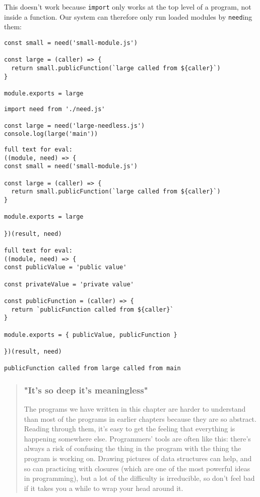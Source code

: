 \documentclass[krantzl]{krantz}
\newenvironment{callout}{\savenotes\begin{tBox}\begin{quotation}\toggletrue{inbox}\renewcommand{\thempfootnote}{\arabic{footnote}}}{\end{quotation}\vspace{\baselineskip}\end{tBox}\togglefalse{inbox}\spewnotes}
\begin{document}
This doesn't work because \texttt{import} only works at the top level of a program,
not inside a function.
Our system can therefore only run loaded modules by \texttt{need}ing them:


\begin{lstlisting}[frame=single,frameround=tttt]
const small = need('small-module.js')

const large = (caller) => {
  return small.publicFunction(`large called from ${caller}`)
}

module.exports = large
\end{lstlisting}



\begin{lstlisting}[frame=single,frameround=tttt]
import need from './need.js'

const large = need('large-needless.js')
console.log(large('main'))
\end{lstlisting}



\begin{lstlisting}[frame=single,frameround=tttt]
full text for eval:
((module, need) => {
const small = need('small-module.js')

const large = (caller) => {
  return small.publicFunction(`large called from ${caller}`)
}

module.exports = large

})(result, need)

full text for eval:
((module, need) => {
const publicValue = 'public value'

const privateValue = 'private value'

const publicFunction = (caller) => {
  return `publicFunction called from ${caller}`
}

module.exports = { publicValue, publicFunction }

})(result, need)

publicFunction called from large called from main
\end{lstlisting}


\begin{callout}


\subsubsection*{"It's so deep it's meaningless"}


The programs we have written in this chapter are harder to understand
than most of the programs in earlier chapters
because they are so abstract.
Reading through them,
it's easy to get the feeling that everything is happening somewhere else.
Programmers' tools are often like this:
there's always a risk of confusing the thing in the program
with the thing the program is working on.
Drawing pictures of data structures can help,
and so can practicing with closures
(which are one of the most powerful ideas in programming),
but a lot of the difficulty is irreducible,
so don't feel bad if it takes you a while to wrap your head around it.

\end{callout}
\end{document}
